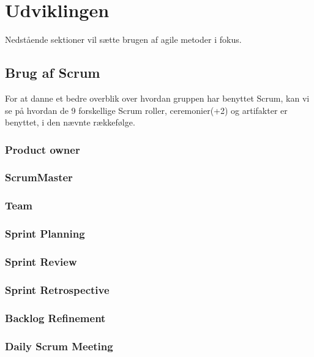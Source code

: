 \chapter{Udviklingen}\label{ch:Udviklingen}

Nedstående sektioner vil sætte brugen af agile metoder i fokus. 

\section{Brug af Scrum}

For at danne et bedre overblik over hvordan gruppen har benyttet Scrum, kan vi se på hvordan de 9 forskellige Scrum roller, ceremonier(+2) og artifakter er benyttet, i den nævnte rækkefølge.

\subsection{Product owner}



\subsection{ScrumMaster}


\subsection{Team}


\subsection{Sprint Planning}


\subsection{Sprint Review}


\subsection{Sprint Retrospective}

\subsection{Backlog Refinement}


\subsection{Daily Scrum Meeting}


